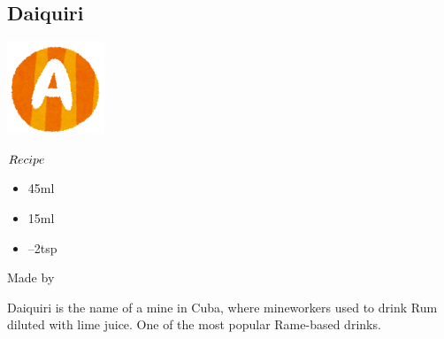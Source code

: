 \subsection{Daiquiri}
\vspace{-7mm}
\hspace{28mm}
\includegraphics[scale=.12]{capital_a.png}
\vspace{2.5mm}
\begin{itembox}[l]{\boldmath $Recipe$}
\begin{itemize}
\setlength{\parskip}{0cm}
\setlength{\itemsep}{0cm}
\item \rum 45ml
\item \limj 15ml
\item {}--2tsp
\end{itemize}
\vspace{-4mm}
Made by \shake
\end{itembox}
Daiquiri is the name of a mine in Cuba, where mineworkers used to drink Rum diluted with lime juice. One of the most popular Rame-based drinks.
